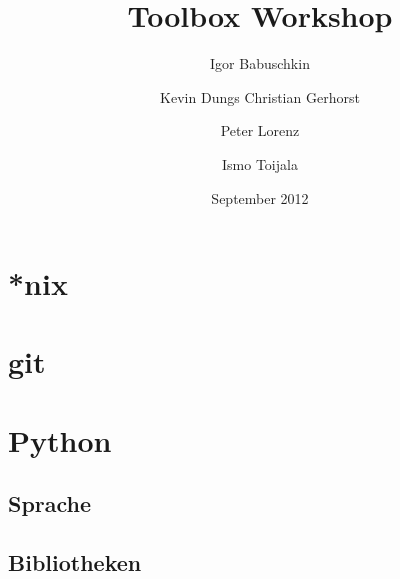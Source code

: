 \documentclass{beamer}
\title{Toolbox Workshop}
\author{Igor Babuschkin \and Kevin Dungs Christian Gerhorst \and Peter Lorenz \and Ismo Toijala}
\institute{PeP et al. e.V.}
\date{September 2012}
\begin{document}
  \begin{frame}
    \titlepage
  \end{frame}
  \begin{frame}
    \tableofcontents
  \end{frame}
  \section{*nix}
    \begin{frame}
    \end{frame}
  \section{git}
    \begin{frame}
    \end{frame}
  \section{Python}
    \begin{frame}
    \end{frame}
    \subsection{Sprache}
      \begin{frame}
      \end{frame}
    \subsection{Bibliotheken}
      \begin{frame}
      \end{frame}
\end{document}
